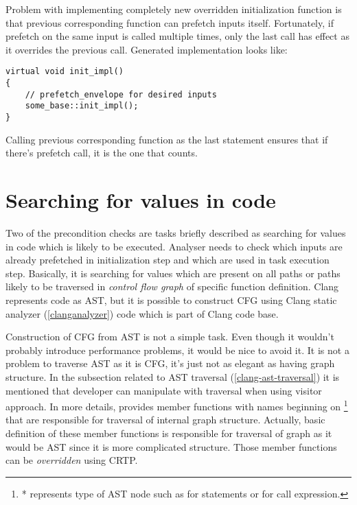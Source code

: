 Problem with implementing completely new overridden initialization function is that previous corresponding function can prefetch inputs itself. Fortunately, if prefetch on the same input is called multiple times, only the last call has effect as it overrides the previous call. Generated implementation looks like:

\begin{lstlisting}
virtual void init_impl()
{
    // prefetch_envelope for desired inputs
    some_base::init_impl();
}
\end{lstlisting}

Calling previous corresponding  function as the last statement ensures that if there's prefetch call, it is the one that counts.

\section{Searching for values in code}
Two of the precondition checks are tasks briefly described as searching for values in code which is likely to be executed. Analyser needs to check which inputs are already prefetched in initialization step and which are used in task execution step. Basically, it is searching for values which are present on all paths or paths likely to be traversed in \emph{control flow graph} of specific function definition. Clang represents code as AST, but it is possible to construct CFG using Clang static analyzer (\ref{clanganalyzer}) code which is part of Clang code base.

Construction of CFG from AST is not a simple task. Even though it wouldn't probably introduce performance problems, it would be nice to avoid it. It is not a problem to traverse AST as it is CFG, it's just not as elegant as having graph structure. In the subsection related to AST traversal (\ref{clang-ast-traversal}) it is mentioned that developer can manipulate with traversal when using visitor approach. In more details,  provides member functions with names beginning on \footnote{* represents type of AST node such as  for statements or  for call expression.} that are responsible for traversal of internal graph structure. Actually, basic definition of these member functions is responsible for traversal of graph as it would be AST since it is more complicated structure. Those member functions can be \textit{overridden} using CRTP.

